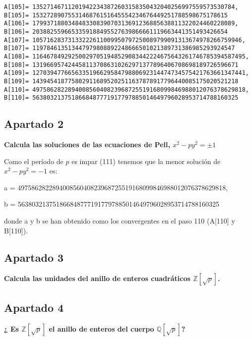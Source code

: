 \documentclass[a4paper]{article}
\begin{document}
\begin{verbatim}
A[105]= 135271467112019422343872603158350432040256997559573530784, 
B[105]= 1532728907553146876151645554234676449251788598675178615
A[106]= 179937188034848330839070313691236885638811322024460228089, 
B[106]= 2038825596653359188495527639866661119663441351493426654
A[107]= 10571628373133222611009950797250089799091313674978266759946, 
B[107]= 119784613513447979808892248666501021389731386985293924547
A[108]= 116467849292500297051948529083442224675643261746785394587495, 
B[108]= 1319669574244581137086310262971377896406708698189726596671
A[109]= 127039477665633519662958479880692314474734575421763661347441, 
B[109]= 1439454187758029116895202511637878917796440085175020521218
A[110]= 497586282289400856040823968725519168099846988012076378629818, 
B[110]= 5638032137518668487771917797885014649796028953714788160325

\end{verbatim}

\subsection{Apartado 2}
\textbf{Calcula las soluciones de las ecuaciones de Pell, $x^2 - py^2=±1$}

Como el período de $p$ es impar (111) tenemos que la menor solución de $x^2-py^2=-1$ es:

a = 497586282289400856040823968725519168099846988012076378629818, 

b = 5638032137518668487771917797885014649796028953714788160325

donde a y b se han obtenido como los convergentes en el paso 110 (A[110] y B[110]).


\subsection{Apartado 3}

\textbf{Calcula las unidades del anillo de enteros cuadráticos $\mathbb{Z}[\sqrt{p}]$.}



\subsection{Apartado 4}

\textbf{¿ Es $\mathbb{Z}[\sqrt{p}]$ el anillo de enteros del cuerpo $\mathbb{Q}[\sqrt{p}]$?}
\end{document}
